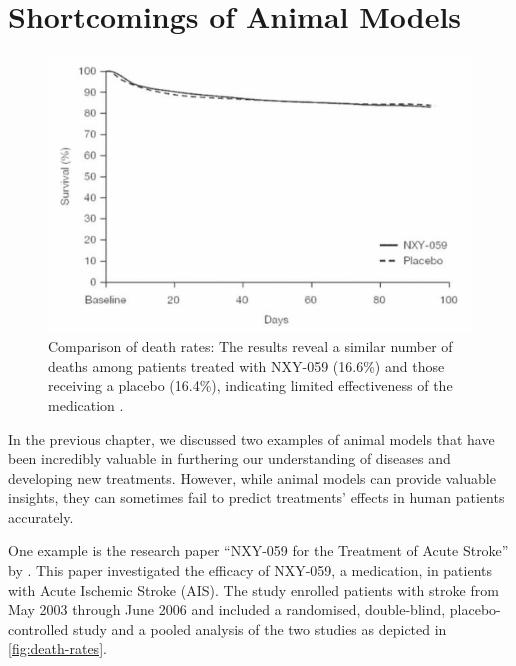 \documentclass[10pt]{article}
\begin{document}
\begin{sloppypar}
  \section{Shortcomings of Animal Models}
  \label{sec:shortcomings}

  \vspace{10pt} %
  \begin{figure}[ht]
    \centering
    \includegraphics[width=\textwidth]{figures/death-rates.png}
    \caption[Comparison of death rates: The results reveal a similar number of deaths among patients treated with NXY-059 (16.6\%) and those receiving a placebo (16.4\%), indicating limited effectiveness of the medication]{Comparison of death rates: The results reveal a similar number of deaths among patients treated with NXY-059 (16.6\%) and those receiving a placebo (16.4\%), indicating limited effectiveness of the medication \citep{diener_nxy-059_2008}.}
    \label{fig:death-rates}
  \end{figure}

  In the previous chapter, we discussed two examples of animal models that have been incredibly valuable in furthering our understanding of diseases and developing new treatments. However, while animal models can provide valuable insights, they can sometimes fail to predict treatments’ effects in human patients accurately.

  One example is the research paper “NXY-059 for the Treatment of Acute Stroke” by \cite{diener_nxy-059_2008}. This paper investigated the efficacy of NXY-059, a medication, in patients with Acute Ischemic Stroke (AIS). The study enrolled patients with stroke from May 2003 through June 2006 and included a randomised, double-blind, placebo-controlled study and a pooled analysis of the two studies as depicted in \autoref{fig:death-rates}.


\end{sloppypar}
\end{document}

